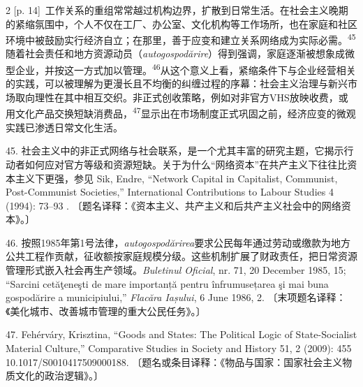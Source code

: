\documentclass[10pt,a4paper]{article}
\begin{document}
\begin{paracol}{2}
{\scriptsize\color{gray} [p. 14]}\ 工作关系的重组常常越过机构边界，扩散到日常生活。在社会主义晚期的紧缩氛围中，个人不仅在工厂、办公室、文化机构等工作场所，也在家庭和社区环境中被鼓励实行经济自立；在那里，善于应变和建立关系网络成为实际必\mbox{需。\textsuperscript{45}}随着社会责任和地方资源动员（\textit{autogospodărire}）得到强调，家庭逐渐被想象成微型企业，并按这一方式加以管\mbox{理。\textsuperscript{46}}从这个意义上看，紧缩条件下与企业经营相关的实践，可以被理解为更漫长且不均衡的纠缠过程的序幕：社会主义治理与新兴市场取向理性在其中相互交织。非正式创收策略，例如对非官方VHS放映收费，或用文化产品交换短缺消费品，\nobreak\textsuperscript{47}显示出在市场制度正式巩固之前，经济应变的微观实践已渗透日常文化生活。\par{\small 45. 社会主义中的非正式网络与社会联系，是一个尤其丰富的研究主题，它揭示行动者如何应对官方等级和资源短缺。关于为什么“网络资本”在共产主义下往往比资本主义下更强，参见 Sik, Endre, “Network Capital in Capitalist, Communist, Post-Communist Societies,” International Contributions to Labour Studies 4 (1994): 73–93 . 〔题名译释：《资本主义、共产主义和后共产主义社会中的网络资本》。〕\par}{\small 46. 按照1985年第1号法律，\textit{autogospodărirea}要求公民每年通过劳动或缴款为地方公共工程作贡献，征收额按家庭规模分级。这些机制扩展了财政责任，把日常资源管理形式嵌入社会再生产领域。\textit{Buletinul Oficial}, nr. 71, 20 December 1985, 15; “Sarcini cetăţeneşti de mare importanță pentru înfrumusețarea şi mai buna gospodărire a municipiului,” \textit{Flacăra Iașului}, 6 June 1986, 2. 〔末项题名译释：《美化城市、改善城市管理的重大公民任务》。〕\par}{\small 47. Fehérváry, Krisztina, “Goods and States: The Political Logic of State-Socialist Material Culture,” Comparative Studies in Society and History 51, 2 (2009): 455 10.1017/S0010417509000188. 〔题名或条目译释：《物品与国家：国家社会主义物质文化的政治逻辑》。〕\par}
\switchcolumn

\end{paracol}
\end{document}
